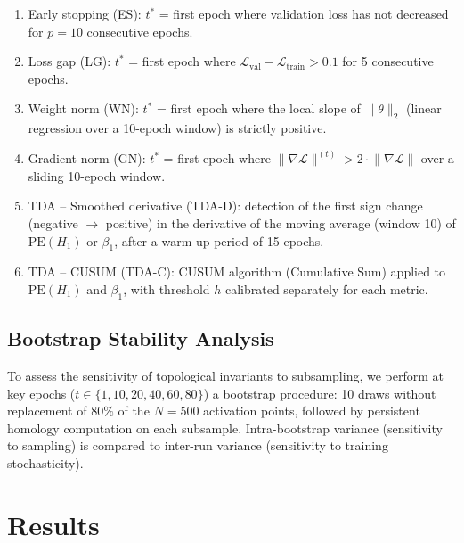 \documentclass[11pt,a4paper]{article}
\newcommand{\betti}{\beta}
\newcommand{\PE}{\mathrm{PE}}
\newcommand{\moy}[1]{\overline{#1}}
\begin{document}
\begin{enumerate}
  \item Early stopping (ES): $t^*$ = first epoch where validation
  loss has not decreased for $p = 10$ consecutive epochs.

  \item Loss gap (LG): $t^*$ = first epoch where
  $\mathcal{L}_{\mathrm{val}} - \mathcal{L}_{\mathrm{train}} > 0.1$
  for 5 consecutive epochs.

  \item Weight norm (WN): $t^*$ = first epoch where the local
  slope of $\|\theta\|_2$ (linear regression over a 10-epoch window)
  is strictly positive.

  \item Gradient norm (GN): $t^*$ = first epoch where
  $\|\nabla\mathcal{L}\|^{(t)} > 2 \cdot \moy{\|\nabla\mathcal{L}\|}$
  over a sliding 10-epoch window.

  \item TDA -- Smoothed derivative (TDA-D): detection of the
  first sign change (negative $\to$ positive) in the derivative of the
  moving average (window 10) of $\PE(H_1)$ or $\betti_1$, after a
  warm-up period of 15 epochs.

  \item TDA -- CUSUM (TDA-C): CUSUM algorithm (Cumulative Sum)
  applied to $\PE(H_1)$ and $\betti_1$, with threshold $h$ calibrated
  separately for each metric.
\end{enumerate}

\subsection{Bootstrap Stability Analysis}
\label{subsec:bootstrap}

To assess the sensitivity of topological invariants to subsampling, we
perform at key epochs ($t \in \{1, 10, 20, 40, 60, 80\}$) a bootstrap
procedure: 10 draws without replacement of $80\%$ of the $N = 500$
activation points, followed by persistent homology computation on each
subsample. Intra-bootstrap variance (sensitivity to sampling) is compared
to inter-run variance (sensitivity to training stochasticity).

\section{Results}
\label{sec:resultats}
\end{document}
